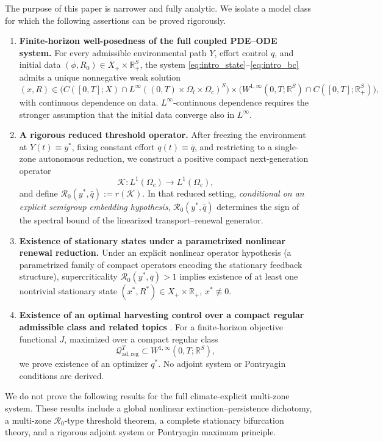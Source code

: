 \documentclass[pdflatex,sn-mathphys-num]{sn-jnl}%
\begin{document}
The purpose of this paper is narrower and fully analytic. We isolate a model class for
which the following assertions can be proved rigorously.
\begin{enumerate}[label=\textbf{(C\arabic*)}]
\item \textbf{Finite-horizon well-posedness of the full coupled PDE--ODE system.}
For every admissible environmental path \(Y\), effort control \(q\), and initial data
\((\phi,R_0)\in X_+\times\mathbb R_+^S\), the system
\eqref{eq:intro_state}--\eqref{eq:intro_bc} admits a unique nonnegative weak solution
\[
(x,R)\in
\Big(C([0,T];X)\cap L^\infty((0,T)\times\Omega_l\times\Omega_c)^S\Big)
\times
\Big(W^{1,\infty}(0,T;\mathbb R^S)\cap C([0,T];\mathbb R_+^S)\Big),
\]
with continuous dependence on data. 
\(L^\infty\)-continuous dependence requires the
stronger assumption that the initial data converge also in \(L^\infty\).

\item \textbf{A rigorous reduced threshold operator.}
After freezing the environment at \(Y(t)\equiv y^\ast\), fixing constant effort
\(q(t)\equiv \bar q\), and restricting to a single-zone autonomous reduction, we
construct a positive compact next-generation operator
\[
\mathcal K:L^1(\Omega_c)\to L^1(\Omega_c),
\]
and define \(\mathcal R_0(y^\ast,\bar q):=r(\mathcal K)\).
In that reduced setting, \emph{conditional on an explicit semigroup embedding hypothesis},
\(\mathcal R_0(y^\ast,\bar q)\) determines the sign of the
spectral bound of the linearized transport--renewal generator.

\item \textbf{Existence of stationary states under a parametrized nonlinear
renewal reduction.}
Under an explicit nonlinear operator hypothesis (a parametrized family of compact
operators encoding the stationary feedback structure), supercriticality
\(\mathcal R_0(y^\ast,\bar q)>1\)
implies existence of at least one nontrivial stationary state
\((x^\ast,R^\ast)\in X_+\times\mathbb R_+\), \(x^\ast\not\equiv 0\).

\item \textbf{Existence of an optimal harvesting control over a compact regular
admissible class and related topics} \cite{ragusa2008commutators,gurtin1981optimal,guariglia2021fractional,murphy1990optimal,abbas2021hybrid,brokate1987certain,guariglia2022fractional,wang2026breakdown,brokate1985pontryagin,alotaibi2024absence,liu2026computational}.
For a finite-horizon objective functional \(J\), maximized over a compact regular class
\[
\mathcal Q_{\mathrm{ad},\mathrm{reg}}^T
\subset W^{1,\infty}(0,T;\mathbb R^S),
\]
we prove existence of an optimizer \(q^\ast\). No adjoint system or Pontryagin conditions
are derived.
\end{enumerate}
We do not prove the following results for the full climate-explicit multi-zone system. These results include a global nonlinear extinction--persistence dichotomy,
a multi-zone \(\mathcal R_0\)-type threshold theorem, a complete stationary bifurcation theory, and a rigorous adjoint system or Pontryagin maximum principle.
\end{document}
